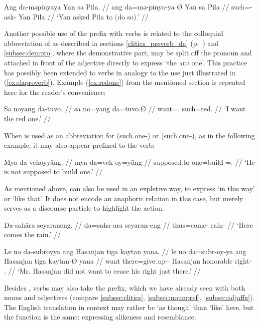 \a\begingl
	\gla Ang da-məpinyaya {} Yan sa Pila. //
	\glb ang da=mə-pinya-ya Ø Yan sa Pila //
	\glc \AgtT{} such=\Pst{}-ask-\TsgM{} \Top{} Yan \Parg{} Pila //
	\glft `Yan asked Pila to (do so).' //
\endgl

\xe

Another possible use of the prefix  with verbs is related to the
colloquial abbreviation of  as described in
sections \autoref{clitics_preverb_da} (p.~\pageref{clitics_preverb_da}) and
\autoref{subsec:dempro}, where the demonstrative part,  may be
split off the pronoun and attached in front of the adjective directly to
express `the \textsc{adj} one'. This practice has possibly been extended to
verbs in analogy to the use just illustrated in (\ref{ex:daproverb}). Example
(\ref{ex:redone}) from the mentioned section is repeated here for the reader's
convenience:

\ex\begingl
	\gla Sa noyang da-tuvo. //
	\glb sa no=yang da=tuvo.Ø //
	\glc \PatT{} want=\Fsg{}.\Aarg{} such=red.\Top{} //
	\glft `I want the red one.' //
\endgl\xe

When  is used as an abbreviation for  
(such.one-\Parg{}) or  (such.one-\PargI{}), as in the 
following example, it may also appear prefixed to the verb:

\ex\begingl
	\gla Mya da-vehoyyāng. //
	\glb mya da=veh-oy=yāng //
	\glc supposed.to one=build-\Neg{}=\Tsg.\M{} //
	\glft `He is not supposed to build one.' //
\endgl\xe

As mentioned above,  can also be used in an expletive way, to 
express `in this way' or `like that'. It does not encode an anaphoric relation 
in this case, but merely serves as a discourse particle to highlight the action.

\pex
\a\begingl
	\gla Da-sahāra seyaraneng. //
	\glb da=saha-ara seyaran-eng //
	\glc thus=come-\TsgI{} rain-\AargI{} //
	\glft `Here comes the rain.' //
\endgl

\a\begingl
	\gla Le no da-subroyya ang Hasanjan tiga kaytan yana. //
	\glb le no da=subr-oy-ya ang Hasanjan tiga kaytan-Ø yana //
	\glc \PatT{} want there=give.up-\Neg{}-\TsgM{} \Aarg{} Hasanjan 
		honorable right-\Top{} \TsgM{}.\Gen{} //
	\glft `Mr. Hasanjan did not want to cease his right just there.' //
\endgl

\xe

Besides , verbs may also take the  prefix,
which we have already seen with both nouns and adjectives (compare
\autoref{subsec:clitics}, \ref{subsec:nounpref}, \ref{subsec:adjaffx}). The
English translation in  context may rather be `as though' than `like' here,
but the function is the  same: expressing alikeness and resemblance.

